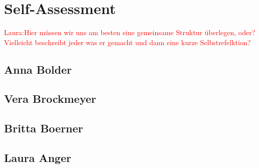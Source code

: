 \section{Self-Assessment} \label{sec:SA} %

\textcolor{red}{Laura:Hier müssen wir uns am besten eine gemeinsame Struktur überlegen, oder? Vielleicht beschreibt jeder was er gemacht und dann eine kurze Selbstrefelktion?}


\subsection{Anna Bolder} \label{sec:SAAnna}



\subsection{Vera Brockmeyer} \label{sec:SAVera}

\subsection{Britta Boerner} \label{sec:SABritta}

\newpage
\subsection{Laura Anger} \label{sec:SALaura}

